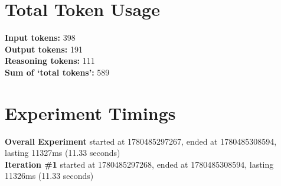 \documentclass{article}
\begin{document}
\section*{Total Token Usage}
\textbf{Input tokens: }398
\\\textbf{Output tokens: }191
\\\textbf{Reasoning tokens: }111
\\\textbf{Sum of `total tokens': }589
\section*{Experiment Timings}
\textbf{Overall Experiment} started at 1780485297267, ended at 1780485308594, lasting 11327ms (11.33 seconds)
\\\textbf{Iteration \#1} started at 1780485297268, ended at 1780485308594, lasting 11326ms (11.33 seconds)
\end{document}
